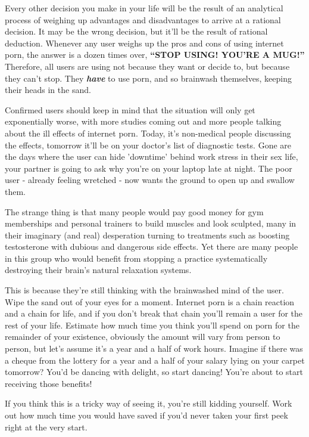 \documentclass[
]{book}
\begin{document}
Every other decision you make in your life will be the result of an analytical process of weighing up advantages and disadvantages to arrive at a rational decision. It may be the wrong decision, but it'll be the result of rational deduction. Whenever any user weighs up the pros and cons of using internet porn, the answer is a dozen times over, \textbf{``STOP USING! YOU'RE A MUG!''} Therefore, all users are using not because they want or decide to, but because they can't stop. They \textbf{\emph{have}} to use porn, and so brainwash themselves, keeping their heads in the sand.

Confirmed users should keep in mind that the situation will only get exponentially worse, with more studies coming out and more people talking about the ill effects of internet porn. Today, it's non-medical people discussing the effects, tomorrow it'll be on your doctor's list of diagnostic tests. Gone are the days where the user can hide 'downtime' behind work stress in their sex life, your partner is going to ask why you're on your laptop late at night. The poor user - already feeling wretched - now wants the ground to open up and swallow them.

The strange thing is that many people would pay good money for gym memberships and personal trainers to build muscles and look sculpted, many in their imaginary (and real) desperation turning to treatments such as boosting testosterone with dubious and dangerous side effects. Yet there are many people in this group who would benefit from stopping a practice systematically destroying their brain's natural relaxation systems.

This is because they're still thinking with the brainwashed mind of the user. Wipe the sand out of your eyes for a moment. Internet porn is a chain reaction and a chain for life, and if you don't break that chain you'll remain a user for the rest of your life. Estimate how much time you think you'll spend on porn for the remainder of your existence, obviously the amount will vary from person to person, but let's assume it's a year and a half of work hours. Imagine if there was a cheque from the lottery for a year and a half of your salary lying on your carpet tomorrow? You'd be dancing with delight, so start dancing! You're about to start receiving those benefits!

If you think this is a tricky way of seeing it, you're still kidding yourself. Work out how much time you would have saved if you'd never taken your first peek right at the very start.
\end{document}
